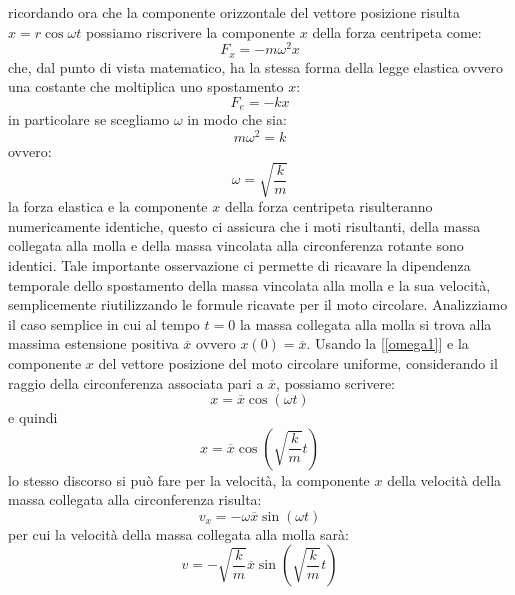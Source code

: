 \documentclass[a4paper,10pt,oneside]{article}
\begin{document}
ricordando ora che la componente orizzontale del vettore posizione risulta $ x=r\cos\omega t$ possiamo riscrivere la componente $x$ della forza centripeta come:
\begin{equation}
 F_x=-m\omega^2x
\end{equation}
che, dal punto di vista matematico, ha la stessa forma della legge elastica ovvero una costante che moltiplica uno spostamento $x$:
\begin{equation}
 F_e=-kx
\end{equation}
in particolare se scegliamo $\omega$ in modo che sia:
\begin{equation}
 m\omega^2=k
\end{equation}
ovvero:
\begin{equation}\label{omega1}
 \omega=\sqrt{\frac k m}
\end{equation}
la forza elastica e la componente $x$ della forza centripeta risulteranno numericamente identiche, questo ci assicura che i moti risultanti, della massa collegata alla molla e della massa vincolata alla circonferenza rotante sono identici.
Tale importante osservazione ci permette di ricavare la dipendenza temporale dello spostamento della massa vincolata alla molla e la sua velocità, semplicemente riutilizzando le formule ricavate per il moto circolare.
Analizziamo il caso semplice in cui al tempo $t=0$ la massa collegata alla molla si trova alla massima estensione positiva $\overline x$ ovvero $x(0)=\overline x$. Usando la [\ref{omega1}] e la componente $x$ del vettore posizione del moto circolare uniforme, considerando il raggio della circonferenza associata  pari a $\overline x$, possiamo scrivere:
\begin{equation}
 x=\overline x \cos(\omega t)
\end{equation}
e quindi
\begin{equation}
 x=\overline x\cos(\sqrt{\frac k m}t)
\end{equation}
lo stesso discorso si può fare per la velocità, la componente $x$ della velocità della massa collegata alla circonferenza risulta:
\begin{equation}
 v_x=-\omega \overline x\sin(\omega t)
\end{equation}
per cui la velocità della massa collegata alla molla sarà:
\begin{equation}
 v=-\sqrt{\frac k m }\overline x\sin(\sqrt{\frac k m }t)
\end{equation}
\end{document}
